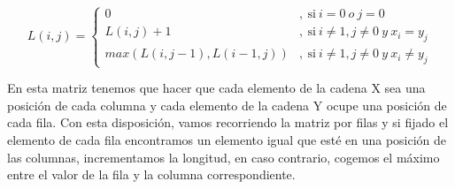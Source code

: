 \[
  L(i,j) = 
  \left \{
    \begin{aligned}
      0 &,\ \text{si} \ i = 0 \ o \ j = 0\\
      L(i,j) + 1 &,\ \text{si} \ i \neq  1 , j \neq  0 \ y \ x_i = y_j\\
      max(L(i,j-1) , L(i-1,j))&,\ \text{si} \ i \neq 1 , j \neq 0 \ y \ x_i \neq y_j
    \end{aligned}
  \right .
\]

En esta matriz tenemos que hacer que cada elemento de la cadena X sea una posición de cada columna 
y cada elemento de la cadena Y ocupe una posición de cada fila. Con esta disposición, vamos recorriendo
la matriz por filas y si fijado el elemento de cada fila encontramos un elemento igual que esté en una 
posición de las columnas, incrementamos la longitud, en caso contrario, cogemos el máximo entre el valor de 
la fila y la columna correspondiente.






% 

